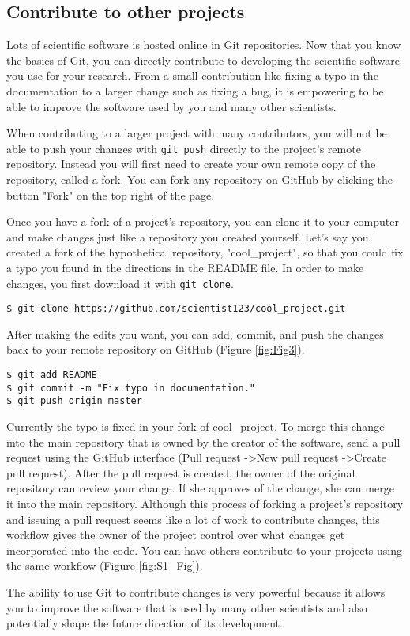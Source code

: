 \subsection{Contribute to other projects}

Lots of scientific software is hosted online in Git repositories.
Now that you know the basics of Git, you can directly contribute to developing the scientific software you use for your research.
From a small contribution like fixing a typo in the documentation to a larger change such as fixing a bug, it is empowering to be able to improve the software used by you and many other scientists.

When contributing to a larger project with many contributors, you will not be able to push your changes with \verb|git push| directly to the project's remote repository.
Instead you will first need to create your own remote copy of the repository, called a fork.
You can fork any repository on GitHub by clicking the button "Fork" on the top right of the page.

Once you have a fork of a project's repository, you can clone it to your computer and make changes just like a repository you created yourself.
Let's say you created a fork of the hypothetical repository, "cool\_project", so that you could fix a typo you found in the directions in the README file.
In order to make changes, you first download it with \verb|git clone|.

\begin{lstlisting}
$ git clone https://github.com/scientist123/cool_project.git
\end{lstlisting}

After making the edits you want, you can add, commit, and push the changes back to your remote repository on GitHub (Figure \ref{fig:Fig3}).

\begin{lstlisting}
$ git add README
$ git commit -m "Fix typo in documentation."
$ git push origin master
\end{lstlisting}

Currently the typo is fixed in your fork of cool\_project.
To merge this change into the main repository that is owned by the creator of the software, send a pull request using the GitHub interface (Pull request -\textgreater New pull request -\textgreater Create pull request).
After the pull request is created, the owner of the original repository can review your change.
If she approves of the change, she can merge it into the main repository.
Although this process of forking a project’s repository and issuing a pull request seems like a lot of work to contribute changes, this workflow gives the owner of the project control over what changes get incorporated into the code. You can have others contribute to your projects using the same workflow (Figure \ref{fig:S1_Fig}). 

The ability to use Git to contribute changes is very powerful because it allows you to improve the software that is used by many other scientists and also potentially shape the future direction of its development.
